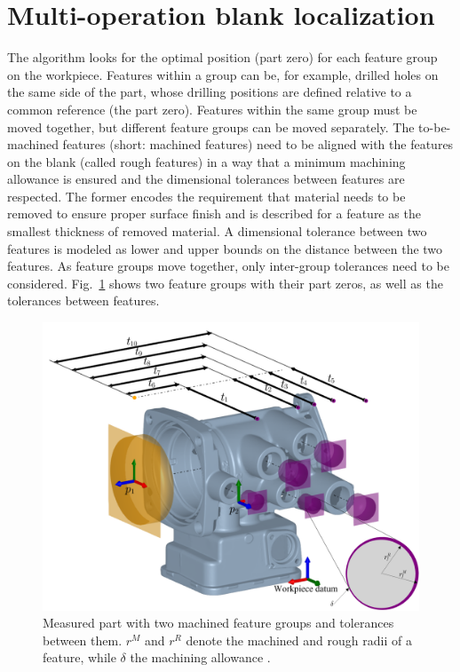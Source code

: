 \documentclass{juliacon}
\begin{document}

\section{Multi-operation blank localization}
\label{sec:algo}

The algorithm looks for the optimal position (part zero) for each feature group on the workpiece. 
Features within a group can be, for example, drilled holes on the same side of the part, whose drilling positions are defined relative to a common reference (the part zero).
Features within the same group must be moved together, but different feature groups can be moved separately.
The to-be-machined features (short: machined features) need to be aligned with the features on the blank (called rough features) in a way that a minimum machining allowance is ensured and the dimensional tolerances between features are respected.
The former encodes the requirement that material needs to be removed to ensure proper surface finish and is described for a feature as the smallest thickness of removed material.
A dimensional tolerance between two features is modeled as lower and upper bounds on the distance between the two features.
As feature groups move together, only inter-group tolerances need to be considered.
Fig.~\ref{fig:hatfig} shows two feature groups with their part zeros, as well as the tolerances between features.

\begin{figure}[b]
	\centerline{\includegraphics[width=0.95\columnwidth]{cirp-annals-2023-figure-2.png}}
	\caption{Measured part with two machined feature groups and tolerances between them. $r^M$ and $r^R$ denote the machined and rough radii of a feature, while $\delta$ the machining allowance \cite{cserteg:2023_Annals}.}
	\label{fig:hatfig}
\end{figure}
\end{document}
